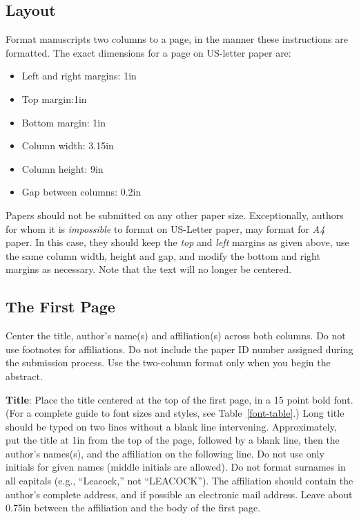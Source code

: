 \documentclass[11pt,letterpaper]{article}
\begin{document}
\subsection{Layout}
\label{ssec:layout}

Format manuscripts two columns to a page, in the manner these
instructions are formatted. The exact dimensions for a page on US-letter
paper are:

\begin{itemize}
\item Left and right margins: 1in
\item Top margin:1in
\item Bottom margin: 1in
\item Column width: 3.15in
\item Column height: 9in
\item Gap between columns: 0.2in
\end{itemize}

\noindent Papers should not be submitted on any other paper size. Exceptionally,
authors for whom it is \emph{impossible} to format on US-Letter paper,
may format for \emph{A4} paper. In this case, they should keep the \emph{top}
and \emph{left} margins as given above, use the same column width,
height and gap, and modify the bottom and right margins as necessary.
Note that the text will no longer be centered.

\subsection{The First Page}
\label{ssec:first}

Center the title, author's name(s) and affiliation(s) across both
columns. Do not use footnotes for affiliations.  Do not include the
paper ID number assigned during the submission process. 
Use the two-column format only when you begin the abstract.

{\bf Title}: Place the title centered at the top of the first page, in
a 15 point bold font.  (For a complete guide to font sizes and styles, see Table~\ref{font-table}.)
Long title should be typed on two lines without
a blank line intervening. Approximately, put the title at 1in from the
top of the page, followed by a blank line, then the author's names(s),
and the affiliation on the following line.  Do not use only initials
for given names (middle initials are allowed). Do not format surnames
in all capitals (e.g., ``Leacock,'' not ``LEACOCK'').  The affiliation should
contain the author's complete address, and if possible an electronic
mail address. Leave about 0.75in between the affiliation and the body
of the first page.
\end{document}
